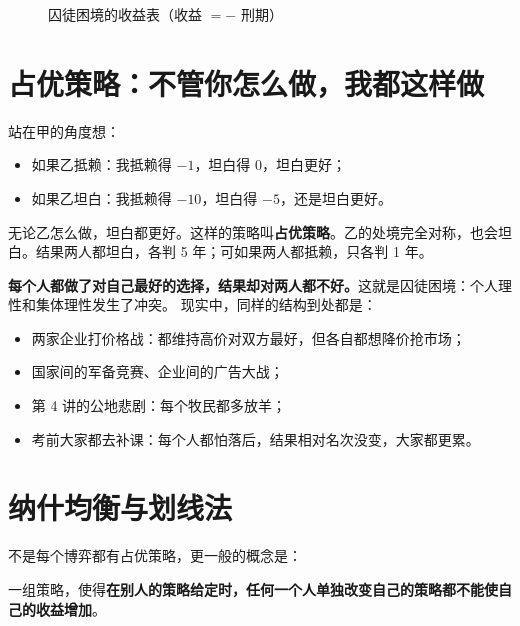 \begin{figure}[!htbp]
\centering
{}
\caption{囚徒困境的收益表（收益 $=-$ 刑期）}
\label{fig:es-pd}
\end{figure}

\section{占优策略：不管你怎么做，我都这样做}

站在甲的角度想：
\begin{itemize}
  \item 如果乙抵赖：我抵赖得 $-1$，坦白得 $0$，坦白更好；
  \item 如果乙坦白：我抵赖得 $-10$，坦白得 $-5$，还是坦白更好。
\end{itemize}
无论乙怎么做，坦白都更好。这样的策略叫\textbf{占优策略}。乙的处境完全对称，也会坦白。结果两人都坦白，各判 5 年；可如果两人都抵赖，只各判 1 年。

\textbf{每个人都做了对自己最好的选择，结果却对两人都不好。}这就是囚徒困境：个人理性和集体理性发生了冲突。
现实中，同样的结构到处都是：
\begin{itemize}
  \item 两家企业打价格战：都维持高价对双方最好，但各自都想降价抢市场；
  \item 国家间的军备竞赛、企业间的广告大战；
  \item 第 4 讲的公地悲剧：每个牧民都多放羊；
  \item 考前大家都去补课：每个人都怕落后，结果相对名次没变，大家都更累。
\end{itemize}

\section{纳什均衡与划线法}

不是每个博弈都有占优策略，更一般的概念是：

\begin{definition}[纳什均衡]
一组策略，使得\textbf{在别人的策略给定时，任何一个人单独改变自己的策略都不能使自己的收益增加}。
\end{definition}

